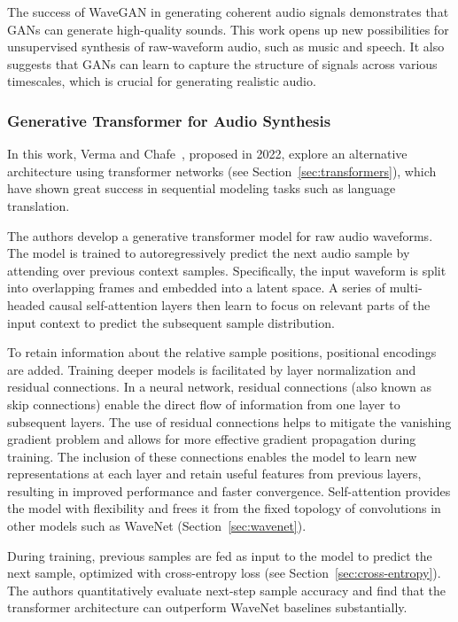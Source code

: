 The success of WaveGAN in generating coherent audio signals demonstrates that \acp{GAN} can generate high-quality sounds. This work opens up new possibilities for unsupervised synthesis of raw-waveform audio, such as music and speech. It also suggests that \acp{GAN} can learn to capture the structure of signals across various timescales, which is crucial for generating realistic audio.

\subsubsection{Generative Transformer for Audio Synthesis}

In this work, Verma and Chafe~\cite{verma_generative_2021}, proposed in 2022, explore an alternative architecture using transformer networks (see Section~\ref{sec:transformers}), which have shown great success in sequential modeling tasks such as language translation.

The authors develop a generative transformer model for raw audio waveforms. The model is trained to autoregressively predict the next audio sample by attending over previous context samples. Specifically, the input waveform is split into overlapping frames and embedded into a latent space. A series of multi-headed causal self-attention layers then learn to focus on relevant parts of the input context to predict the subsequent sample distribution.

To retain information about the relative sample positions, positional encodings are added. Training deeper models is facilitated by layer normalization and residual connections. In a neural network, residual connections (also known as skip connections) enable the direct flow of information from one layer to subsequent layers. The use of residual connections helps to mitigate the vanishing gradient problem and allows for more effective gradient propagation during training. The inclusion of these connections enables the model to learn new representations at each layer and retain useful features from previous layers, resulting in improved performance and faster convergence. Self-attention provides the model with flexibility and frees it from the fixed topology of convolutions in other models such as WaveNet (Section~\ref{sec:wavenet}).

During training, previous samples are fed as input to the model to predict the next sample, optimized with cross-entropy loss (see Section~\ref{sec:cross-entropy}). The authors quantitatively evaluate next-step sample accuracy and find that the transformer architecture can outperform WaveNet baselines substantially.

